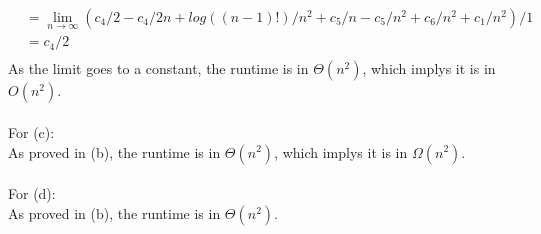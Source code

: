 \documentclass{assignment}
\begin{document}
\begin{problemlist}
\begin{answer}
\begin{align*}
&=\lim_{n\rightarrow \infty}(c_4/2 - c_4/2n + log((n-1)!)/n^2 + c_5/n-c_5/n^2+c_6/n^2+c_1/n^2)/1\\
&=c_4/2\\
\end{align*}
As the limit goes to a constant, the runtime is in $\Theta (n^2)$, which implys it is in $O(n^2)$.\\\\
For (c):\\
As proved in (b), the runtime is in $\Theta (n^2)$, which implys it is in $\Omega (n^2)$.\\\\
For (d):\\
As proved in (b), the runtime is in $\Theta (n^2)$.
\end{answer}

\end{problemlist}
\end{document}
